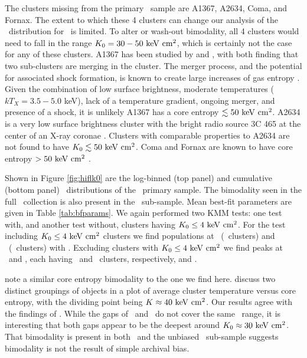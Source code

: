 \documentclass[12pt,preprint]{aastex}
\begin{document}
The clusters missing from the primary \hifl\ sample are A1367, A2634,
Coma, and Fornax. The extent to which these 4 clusters can change our
analysis of the \kna\ distribution for \hifl\ is limited.  To alter or
wash-out bimodality, all 4 clusters would need to fall in the range
$K_0 = 30-50 \mathrm{\mbox{\ensuremath{\mathrm{~keV}}} \mathrm{\mbox{\ensuremath{\mathrm{~cm}}}^2}}$, which is certainly not the case for any of these
clusters. A1367 has been studied by \citet{1998ApJ...500..138D} and
\citet{2002ApJ...576..708S}, with both finding that two sub-clusters
are merging in the cluster. The merger process, and the potential for
associated shock formation, is known to create large increases of gas
entropy \citep{2007MNRAS.376..497M}. Given the combination of low
surface brightness, moderate temperatures ($kT_X = 3.5-5.0$ keV), lack
of a temperature gradient, ongoing merger, and presence of a shock, it
is unlikely A1367 has a core entropy $\lesssim 50 \mathrm{\mbox{\ensuremath{\mathrm{~keV}}} \mathrm{\mbox{\ensuremath{\mathrm{~cm}}}^2}}$. A2634 is a very
low surface brightness cluster with the bright radio source 3C 465 at
the center of an X-ray coronae \citep{coronae}. Clusters with
comparable properties to A2634 are not found to have $K_0 \lesssim 50
\mathrm{\mbox{\ensuremath{\mathrm{~keV}}} \mathrm{\mbox{\ensuremath{\mathrm{~cm}}}^2}}$. Coma and Fornax are known to have core entropy $> 50 \mathrm{\mbox{\ensuremath{\mathrm{~keV}}} \mathrm{\mbox{\ensuremath{\mathrm{~cm}}}^2}}$
\citep[][C. Scharf, private communication]{2008arXiv0802.1864R}.

Shown in Figure \ref{fig:hiflk0} are the log-binned (top panel) and
cumulative (bottom panel) \kna\ distributions of the \hifl\ primary
sample. The bimodality seen in the full \accept\ collection is also
present in the \hifl\ sub-sample. Mean best-fit parameters are given
in Table \ref{tab:bfparams}. We again performed two KMM tests: one
test with, and another test without, clusters having $K_0 \le 4
\mathrm{\mbox{\ensuremath{\mathrm{~keV}}} \mathrm{\mbox{\ensuremath{\mathrm{~cm}}}^2}}$. For the test including $K_0 \le 4 \mathrm{\mbox{\ensuremath{\mathrm{~keV}}} \mathrm{\mbox{\ensuremath{\mathrm{~cm}}}^2}}$ clusters we find
populations at \hiflkmma\ (\hiflkmmc\ clusters) and
\hiflkmmb\ (\hiflkmmd\ clusters) with \hiflkmme. Excluding clusters
with $K_0 \le 4 \mathrm{\mbox{\ensuremath{\mathrm{~keV}}} \mathrm{\mbox{\ensuremath{\mathrm{~cm}}}^2}}$ we find peaks at \hiflkmmf\ and \hiflkmmg, each
having \hiflkmmh\ and \hiflkmmi\ clusters, respectively, and
\hiflkmmj.

\citet{2007hvcg.conf...42H} note a similar core entropy bimodality to
the one we find here. \citet{2007hvcg.conf...42H} discuss two distinct
groupings of objects in a plot of average cluster temperature versus
core entropy, with the dividing point being $K \approx 40 \mathrm{\mbox{\ensuremath{\mathrm{~keV}}} \mathrm{\mbox{\ensuremath{\mathrm{~cm}}}^2}}$. Our
results agree with the findings of \citet{2007hvcg.conf...42H}. While
the gaps of \accept\ and \hifl\ do not cover the same \kna\ range, it
is interesting that both gaps appear to be the deepest around $K_0
\approx 30 \mathrm{\mbox{\ensuremath{\mathrm{~keV}}} \mathrm{\mbox{\ensuremath{\mathrm{~cm}}}^2}}$. That bimodality is present in both \accept\ and the
unbiased \hifl\ sub-sample suggests bimodality is not the result of
simple archival bias.
\end{document}
